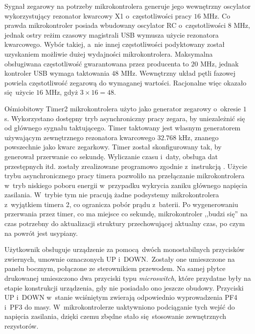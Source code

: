 Sygnał zegarowy na potrzeby mikrokontrolera generuje jego wewnętrzny oscylator wykorzystujący rezonator kwarcowy X1 o~częstotliwości pracy $16$ MHz. Co prawda mikrokontroler posiada wbudowany oscylator RC o~częstotliwości $8$ MHz, jednak ostry reżim czasowy magistrali USB wymusza użycie rezonatora kwarcowego. Wybór takiej, a~nie innej częstotliwości podyktowany został uzyskaniem możliwie dużej wydajności mikrokontrolera. Maksymalna obsługiwana częstotliwość gwarantowana przez producenta to $20$ MHz, jednak kontroler USB wymaga taktowania $48$ MHz. Wewnętrzny układ pętli fazowej powiela częstotliwość zegarową do wymaganej wartości. Racjonalne więc okazało się użycie $16$ MHz, gdyż $3 \times 16 = 48$.

Ośmiobitowy Timer2 mikrokontrolera użyto jako generator zegarowy o~okresie $1$ s. Wykorzystano dostępny tryb asynchroniczny pracy zegara, by uniezależnić się od głównego sygnału taktującego. Timer taktowany jest własnym generatorem używającym zewnętrznego rezonatora kwarcowego $32.768$ kHz, znanego powszechnie jako kwarc zegarkowy. Timer został skonfigurowany tak, by generował przerwanie co sekundę. Wyliczanie czasu i~daty, obsługa dat przestępnych itd. zostały zrealizowane programowo zgodnie z~instrukcją \cite{an-134}. Użycie trybu asynchronicznego pracy timera pozwoliło na przełączanie mikrokontrolera w~tryb niskiego poboru energii w~przypadku wykrycia zaniku głównego napięcia zasilania. W~trybie tym nie pracują żadne podsystemy mikrokontrolera z~wyjątkiem timera 2, co ogranicza pobór prądu z~baterii. Po wygenerowaniu przerwania przez timer, co ma miejsce co sekundę, mikrokontroler ,,budzi się'' na czas potrzebny do aktualizacji struktury przechowującej aktualny czas, po czym na powrót jest usypiany.

Użytkownik obsługuje urządzenie za pomocą dwóch monostabilnych przycisków zwiernych, umownie oznaczonych UP i~DOWN.~Zostały one umieszczone na panelu bocznym, połączone ze sterownikiem przewodem. Na samej płytce drukowanej umieszczono dwa przyciski typu \textit{microswitch}, które przydatne były na etapie konstrukcji urządzenia, gdy nie posiadało ono jeszcze obudowy. Przyciski UP i~DOWN w~stanie wciśniętym zwierają odpowiednio wyprowadzenia PF4 i~PF3 do masy. W~mikrokontrolerze uaktywniono podciąganie tych wejść do napięcia zasilania, dzięki czemu zbędne stało się stosowanie zewnętrznych rezystorów.

